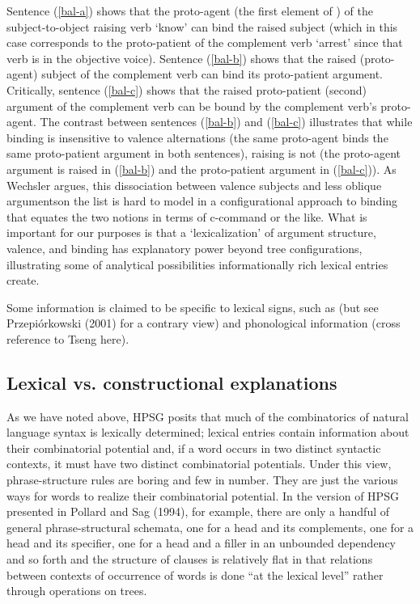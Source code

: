 \documentclass[output=paper]{langsci/langscibook}
\begin{document}
Sentence (\ref{bal-a}) shows that the proto-agent (the first element of ) of the subject-to-object raising verb  `know' can bind the raised subject (which in this case corresponds to the proto-patient of the complement verb  `arrest' since that verb is in the objective voice). Sentence (\ref{bal-b}) shows that the raised (proto-agent) subject of the complement verb can bind its proto-patient argument. Critically, sentence (\ref{bal-c}) shows that the raised proto-patient (second) argument of the complement verb can be bound by the complement verb's proto-agent. The contrast between sentences (\ref{bal-b}) and (\ref{bal-c}) illustrates that while binding is insensitive to valence alternations (the same proto-agent binds the same proto-patient argument in both sentences), raising is not (the proto-agent argument is raised in (\ref{bal-b}) and the proto-patient argument in (\ref{bal-c})). As Wechsler argues, this dissociation between valence subjects and less oblique argumentson the  list is hard to model in a configurational approach to binding that equates the two notions in terms of c-command or the like. What is important for our purposes is that a `lexicalization' of argument structure, valence, and binding has explanatory power beyond tree configurations, illustrating some of analytical possibilities informationally rich lexical entries create. 



Some information is claimed to be specific to lexical signs, such as  (but see Przepiórkowski (2001) for a contrary view) and phonological information (cross reference to Tseng here).


\subsection{Lexical vs. constructional explanations}
		

As we have noted above, HPSG posits that much of the combinatorics of natural language syntax is lexically determined; lexical entries contain information about their combinatorial potential and, if a word occurs in two distinct syntactic contexts, it must have two distinct combinatorial potentials. Under this view, phrase-structure rules are boring and few in number. They are just the various ways for words to realize their combinatorial potential. In the version of HPSG presented in Pollard and Sag (1994), for example, there are only a handful of general phrase-structural schemata, one for a head and its complements, one for a head and its specifier, one for a head and a filler in an unbounded dependency and so forth and the structure of clauses is relatively flat in that relations between contexts of occurrence of words is done ``at the lexical level'' rather through operations on trees. 
\end{document}

